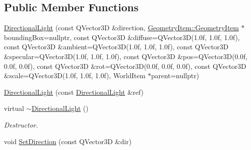 \subsection*{Public Member Functions}
\begin{DoxyCompactItemize}
\item 
\mbox{\hyperlink{class_geometry_engine_1_1_geometry_world_item_1_1_geometry_light_1_1_directional_light_ab11752fa06e7f257334bf12cab849139}{Directional\+Light}} (const Q\+Vector3D \&direction, \mbox{\hyperlink{class_geometry_engine_1_1_geometry_world_item_1_1_geometry_item_1_1_geometry_item}{Geometry\+Item\+::\+Geometry\+Item}} $\ast$bounding\+Box=nullptr, const Q\+Vector3D \&diffuse=Q\+Vector3D(1.\+0f, 1.\+0f, 1.\+0f), const Q\+Vector3\+D \&ambient=\+Q\+Vector3\+D(1.\+0f, 1.\+0f, 1.\+0f), const Q\+Vector3\+D \&specular=\+Q\+Vector3\+D(1.\+0f, 1.\+0f, 1.\+0f), const Q\+Vector3\+D \&pos=\+Q\+Vector3\+D(0.\+0f, 0.\+0f, 0.\+0f), const Q\+Vector3\+D \&rot=\+Q\+Vector3\+D(0.\+0f, 0.\+0f, 0.\+0f), const Q\+Vector3\+D \&scale=\+Q\+Vector3\+D(1.\+0f, 1.\+0f, 1.\+0f), World\+Item $\ast$parent=nullptr)
\item 
\mbox{\hyperlink{class_geometry_engine_1_1_geometry_world_item_1_1_geometry_light_1_1_directional_light_a51bac310074f6315122e23c2d9e28d6f}{Directional\+Light}} (const \mbox{\hyperlink{class_geometry_engine_1_1_geometry_world_item_1_1_geometry_light_1_1_directional_light}{Directional\+Light}} \&ref)
\item 
\mbox{\label{class_geometry_engine_1_1_geometry_world_item_1_1_geometry_light_1_1_directional_light_a3f337a552f7d5700e2149fce03e4fbf1}} 
virtual \mbox{\hyperlink{class_geometry_engine_1_1_geometry_world_item_1_1_geometry_light_1_1_directional_light_a3f337a552f7d5700e2149fce03e4fbf1}{$\sim$\+Directional\+Light}} ()
\begin{DoxyCompactList}\small\item\em Destructor. \end{DoxyCompactList}\item 
\mbox{\label{class_geometry_engine_1_1_geometry_world_item_1_1_geometry_light_1_1_directional_light_a5cac3a371ef72b22c962a4432fa3afa3}} 
void \mbox{\hyperlink{class_geometry_engine_1_1_geometry_world_item_1_1_geometry_light_1_1_directional_light_a5cac3a371ef72b22c962a4432fa3afa3}{Set\+Direction}} (const Q\+Vector3D \&dir)

\end{DoxyCompactItemize}
